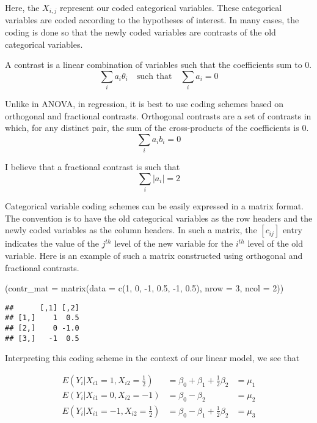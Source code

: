 \documentclass[
]{book}
\newenvironment{Shaded}{\begin{snugshade}}{\end{snugshade}}
\newcommand{\AttributeTok}[1]{\textcolor[rgb]{0.77,0.63,0.00}{#1}}
\newcommand{\DecValTok}[1]{\textcolor[rgb]{0.00,0.00,0.81}{#1}}
\newcommand{\FloatTok}[1]{\textcolor[rgb]{0.00,0.00,0.81}{#1}}
\newcommand{\FunctionTok}[1]{\textcolor[rgb]{0.00,0.00,0.00}{#1}}
\newcommand{\NormalTok}[1]{#1}
\newcommand{\SpecialCharTok}[1]{\textcolor[rgb]{0.00,0.00,0.00}{#1}}
\begin{document}
Here, the \(X_{i,j}\) represent our coded categorical variables. These
categorical variables are coded according to the hypotheses of interest.
In many cases, the coding is done so that the newly coded variables are
contrasts of the old categorical variables.

A contrast is a linear combination of variables such that the
coefficients sum to 0.
\[\sum_i{a_i\theta_i}\quad\text{such that}\quad\sum_i{a_i}=0\]

Unlike in ANOVA, in regression, it is best to use coding schemes based
on orthogonal and fractional contrasts. Orthogonal contrasts are a set
of contrasts in which, for any distinct pair, the sum of the
cross-products of the coefficients is 0.
\[
\sum_i{a_ib_i}=0
\]

I believe that a fractional contrast is such that
\[
\sum_i{|a_i|}=2
\]

Categorical variable coding schemes can be easily expressed in a matrix
format. The convention is to have the old categorical variables as the
row headers and the newly coded variables as the column headers. In such
a matrix, the \([c_{ij}]\) entry indicates the value of the \(j^{th}\) level
of the new variable for the \(i^{th}\) level of the old variable. Here is
an example of such a matrix constructed using orthogonal and fractional
contrasts.

\begin{Shaded}
\begin{Highlighting}[]
\NormalTok{(}\AttributeTok{contr\_mat =} \FunctionTok{matrix}\NormalTok{(}\AttributeTok{data =} \FunctionTok{c}\NormalTok{(}\DecValTok{1}\NormalTok{, }\DecValTok{0}\NormalTok{, }\SpecialCharTok{{-}}\DecValTok{1}\NormalTok{, }\FloatTok{0.5}\NormalTok{, }\SpecialCharTok{{-}}\DecValTok{1}\NormalTok{, }\FloatTok{0.5}\NormalTok{),}
    \AttributeTok{nrow =} \DecValTok{3}\NormalTok{, }\AttributeTok{ncol =} \DecValTok{2}\NormalTok{))}
\end{Highlighting}
\end{Shaded}

\begin{verbatim}
##      [,1] [,2]
## [1,]    1  0.5
## [2,]    0 -1.0
## [3,]   -1  0.5
\end{verbatim}

Interpreting this coding scheme in the context of our linear model, we
see that

\[
\begin{aligned}
E(Y_i|X_{i1}=1,X_{i2}=\tfrac{1}{2}) &= \beta_0+\beta_1+\tfrac{1}{2}\beta_2 &= \mu_1 \\
E(Y_i|X_{i1}=0,X_{i2}=-1) &= \beta_0-\beta_2 &= \mu_2\\
E(Y_i|X_{i1}=-1,X_{i2}=\tfrac{1}{2}) &= \beta_0-\beta_1+\tfrac{1}{2}\beta_2 &= \mu_3
\end{aligned}
\]
\end{document}
